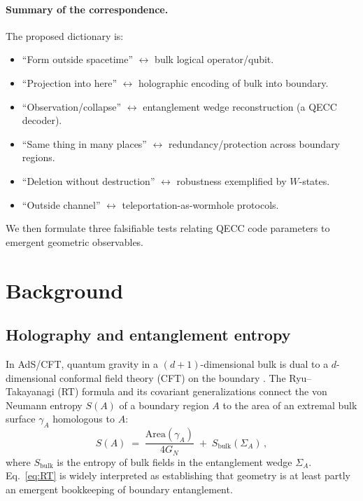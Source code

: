 \documentclass[11pt]{article}
\begin{document}
\paragraph{Summary of the correspondence.} The proposed dictionary is:
\begin{itemize}
    \item ``Form outside spacetime'' $\leftrightarrow$ bulk logical operator/qubit.
    \item ``Projection into here'' $\leftrightarrow$ holographic encoding of bulk into boundary.
    \item ``Observation/collapse'' $\leftrightarrow$ entanglement wedge reconstruction (a QECC decoder).
    \item ``Same thing in many places'' $\leftrightarrow$ redundancy/protection across boundary regions.
    \item ``Deletion without destruction'' $\leftrightarrow$ robustness exemplified by $W$-states.
    \item ``Outside channel'' $\leftrightarrow$ teleportation-as-wormhole protocols.
\end{itemize}
We then formulate three falsifiable tests relating QECC code parameters to emergent geometric observables.

\section{Background}
\subsection{Holography and entanglement entropy}
In AdS/CFT, quantum gravity in a $(d{+}1)$-dimensional bulk is dual to a $d$-dimensional conformal field theory (CFT) on the boundary \cite{Maldacena1998}. The Ryu--Takayanagi (RT) formula and its covariant generalizations \cite{RT2006,HRT2007} connect the von Neumann entropy $S(A)$ of a boundary region $A$ to the area of an extremal bulk surface $\gamma_A$ homologous to $A$:
\begin{equation}
S(A) \;=\; \frac{\mathrm{Area}(\gamma_A)}{4 G_N} \;+\; S_{\mathrm{bulk}}(\Sigma_A)\,,
\label{eq:RT}
\end{equation}
where $S_{\mathrm{bulk}}$ is the entropy of bulk fields in the entanglement wedge $\Sigma_A$. Eq.~\eqref{eq:RT} is widely interpreted as establishing that geometry is at least partly an emergent bookkeeping of boundary entanglement.
\end{document}
